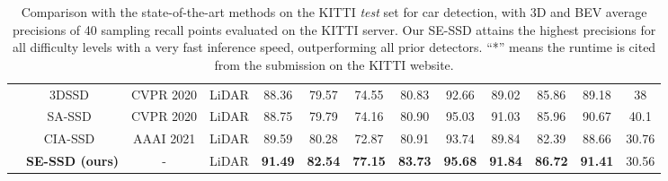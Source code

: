 \documentclass[letterpaper]{article}
\begin{document}
\begin{table*}[t]
\begin{tabular}{c|c|c|c|cccc|cccc|c}
         & 3DSSD~\cite{yang20203dssd}       &CVPR 2020   &{LiDAR}      & 88.36  & 79.57  & 74.55 &80.83 &92.66  &89.02  &85.86  &89.18 & 38\\
         & SA-SSD~\cite{he2020structure}    &CVPR 2020    &{LiDAR}      & 88.75  & 79.79  & 74.16 &80.90 &95.03 &91.03 &85.96 &90.67 & 40.1\\
         & CIA-SSD~\cite{zheng2020cia}    &AAAI 2021    &{LiDAR}      & 89.59   & 80.28   & 72.87  &80.91 &93.74 &89.84 &82.39  &88.66 & 30.76\\
         \cline{2-12}
         & \bf SE-SSD (ours) &- &{LiDAR} & \bf91.49  &\bf82.54  &\bf77.15 &\bf83.73 &\bf95.68 &\bf91.84 &\bf86.72 &\bf91.41 & 30.56\\
      \hline
   \end{tabular}
\vspace*{1mm}
   \caption{Comparison with the state-of-the-art methods on the KITTI \textit{test} set for car detection, with 3D and BEV average precisions of 40 sampling recall points evaluated on the KITTI server. Our SE-SSD attains the highest precisions for all difficulty levels with a very fast inference speed, outperforming all prior detectors. ``*'' means the runtime is cited from the submission on the KITTI website.
   }
   \vspace*{-3mm}
   \label{table1}
\end{table*}
\end{document}
